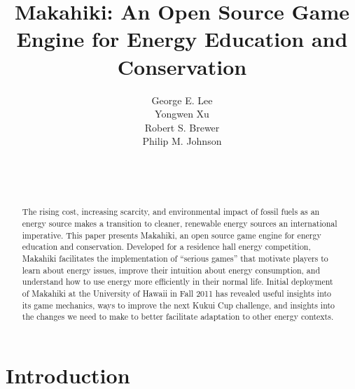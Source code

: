 \documentclass{acm_proc_article-sp}
\begin{document}
\title{Makahiki: An Open Source Game Engine for Energy Education and Conservation}


\author{
\smallskip
George E. Lee\\ 
\smallskip
Yongwen Xu\\ 
\smallskip
Robert S. Brewer\\ 
\smallskip
Philip M. Johnson\\
       \\
       \\
       \\
}


\maketitle
\begin{abstract}
  The rising cost, increasing scarcity, and environmental impact of fossil
  fuels as an energy source makes a transition to cleaner, renewable energy
  sources an international imperative.  This paper presents Makahiki, an open
  source game engine for energy education and conservation. Developed for a
  residence hall energy competition, Makahiki facilitates the implementation of
  ``serious games'' that motivate players to learn about energy issues,
  improve their intuition about energy consumption, and understand how to use energy more
  efficiently in their normal life.  Initial deployment of Makahiki at the
  University of Hawaii in Fall 2011 has revealed useful insights into its game
  mechanics, ways to improve the next Kukui Cup challenge, and insights
  into the changes we need to make to better facilitate adaptation to other energy contexts.
\end{abstract}




\section{Introduction}
\end{document}
